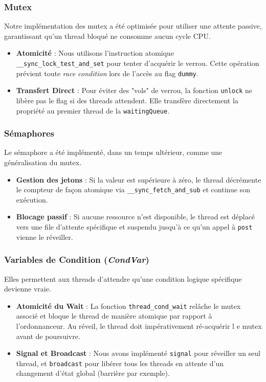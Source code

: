 \subsubsection{Mutex}
Notre implémentation des mutex a été optimisée pour utiliser une attente passive, 
garantissant qu'un thread bloqué ne consomme aucun cycle CPU.
\begin{itemize}
    \item \textbf{Atomicité} : Nous utilisons l'instruction atomique \texttt{\_\_sync\_lock\_test\_and\_set} pour tenter 
    d'acquérir le verrou. Cette opération prévient toute \textit{race condition} lors de l'accès au 
    flag \texttt{dummy}.
    \item \textbf{Transfert Direct} : Pour éviter des "vols" de verrou, la fonction \texttt{unlock} ne libère pas le flag si des threads attendent. 
    Elle transfère directement la propriété au premier thread de la \texttt{waitingQueue}.
\end{itemize}

\subsubsection{Sémaphores}
Le sémaphore a été implémenté, dans un temps ultérieur, comme une généralisation du mutex.
\begin{itemize}
    \item \textbf{Gestion des jetons} : Si la valeur est supérieure à zéro, le thread décrémente le compteur de façon 
    atomique via \texttt{\_\_sync\_fetch\_and\_sub} et continue son exécution.
    \item \textbf{Blocage passif} : Si aucune ressource n'est disponible, le thread est déplacé vers une file d'attente
     spécifique et suspendu jusqu'à ce qu'un appel à \texttt{post} vienne le réveiller.
\end{itemize}

\subsubsection{Variables de Condition (\textit{CondVar})}
Elles permettent aux threads d'attendre qu'une condition logique spécifique devienne vraie.
\begin{itemize}
    \item \textbf{Atomicité du Wait} : La fonction \texttt{thread\_cond\_wait} relâche le mutex associé et bloque 
    le thread de manière atomique par rapport à l'ordonnanceur. Au réveil, le thread doit impérativement ré-acquérir l
    e mutex avant de poursuivre.
    \item \textbf{Signal et Broadcast} : Nous avons implémenté \texttt{signal} pour réveiller un seul thread,
     et \texttt{broadcast} pour libérer tous les threads en attente d'un changement d'état global (barrière par exemple).
\end{itemize}

